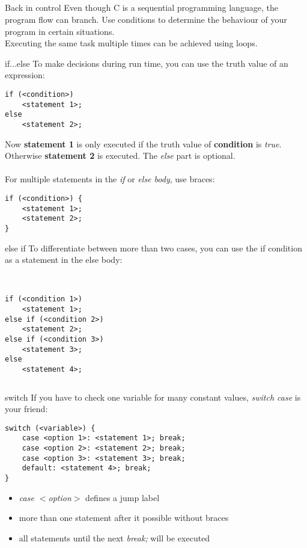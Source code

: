 \subsection{}
\begin{frame}{Back in control}
	Even though C is a sequential programming language, the program flow can branch. Use conditions to determine the behaviour of your program in certain situations.\\
	Executing the same task multiple times can be achieved using loops.
\end{frame}
\begin{frame}[fragile]{if...else}
	To make decisions during run time, you can use the truth value of an expression:
	\begin{lstlisting}[numbers=none]
if (<condition>)
	<statement 1>;
else
	<statement 2>;
\end{lstlisting}
	Now \textbf{statement 1} is only executed if the truth value of \textbf{condition} is \textit{true}. Otherwise \textbf{statement 2} is executed. The \textit{else} part is optional.\\\ \\
	For multiple statements in the \textit{if} or \textit{else body}, use braces:
	\begin{lstlisting}[numbers=none]
if (<condition>) {
	<statement 1>;
	<statement 2>;
}
\end{lstlisting}
\end{frame}
\begin{frame}[fragile]{else if}
	To differentiate between more than two cases, you can use the if condition as a statement in the else body:\\\ \\
	\begin{columns}[T]
			\begin{lstlisting}[numbers=none]
if (<condition 1>)
	<statement 1>;
else if (<condition 2>)
	<statement 2>;
else if (<condition 3>)
	<statement 3>;
else
	<statement 4>;
\end{lstlisting}
	\end{columns}
\end{frame}
\begin{frame}[fragile]{switch}
	If you have to check one variable for many constant values, \textit{switch case} is your friend:
	\begin{lstlisting}[numbers=none]
switch (<variable>) {
	case <option 1>: <statement 1>; break;
	case <option 2>: <statement 2>; break;
	case <option 3>: <statement 3>; break;
	default: <statement 4>; break;
}
\end{lstlisting}
	\begin{itemize}
	\item \textit{case $<$option$>$} defines a jump label
	\item more than one statement after it possible without braces
	\item all statements until the next \textit{break;} will be executed
\end{itemize}	 
\end{frame}
